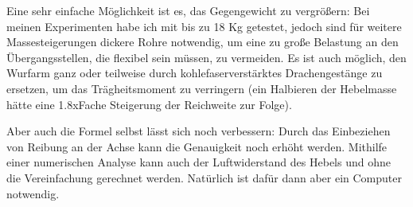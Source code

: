 Eine sehr einfache Möglichkeit ist es, das Gegengewicht zu vergrößern: Bei meinen Experimenten habe ich mit bis zu 18 Kg getestet, jedoch sind für weitere Massesteigerungen dickere Rohre notwendig, um eine zu große Belastung an den Übergangsstellen, die flexibel sein müssen, zu vermeiden. Es ist auch möglich, den Wurfarm ganz oder teilweise durch kohlefaserverstärktes Drachengestänge zu ersetzen, um das Trägheitsmoment zu verringern (ein Halbieren der Hebelmasse hätte eine 1.8xFache Steigerung der Reichweite zur Folge).

Aber auch die Formel selbst lässt sich noch verbessern: Durch das Einbeziehen von Reibung an der Achse kann die Genauigkeit noch erhöht werden. Mithilfe einer numerischen Analyse kann auch der Luftwiderstand des Hebels und ohne die Vereinfachung gerechnet werden. Natürlich ist dafür dann aber ein Computer notwendig.